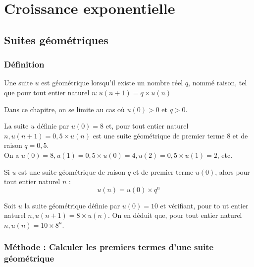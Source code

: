 \chapter{Croissance exponentielle}
\thispagestyle{fancy}

\section{Suites géométriques}

\subsection{Définition}

\begin{definition}
	Une suite $u$ est géométrique lorsqu'il existe un nombre réel $q$, nommé raison, tel que pour tout entier naturel $n: u(n+1)=q \times u(n)$
\end{definition}

\begin{remarque}
	Dans ce chapitre, on se limite au cas où $u(0)>0$ et $q>0$.
\end{remarque}

\begin{exemple}
	La suite $u$ définie par $u(0)=8$ et, pour tout entier naturel $n, u(n+1)=0,5 \times u(n)$ est une suite géométrique de premier terme 8 et de raison $q=0,5$.\\
	On a $u(0)=8, u(1)=0,5 \times u(0)=4, u(2)=0,5 \times u(1)=2$, etc.
\end{exemple}

\begin{propriete}
	Si $u$ est une suite géométrique de raison $q$ et de premier terme $u(0)$, alors pour tout entier naturel $n$ :
	$$
	u(n)=u(0) \times q^n
	$$
\end{propriete}

\begin{exemple}
	Soit $u$ la suite géométrique définie par $u(0)=10$ et vérifiant, pour to ut entier naturel $n, u(n+1)=8 \times u(n)$. On en déduit que, pour tout entier naturel $n, u(n)=10 \times 8^n$.
\end{exemple}

\subsection{Méthode : Calculer les premiers termes d'une suite géométrique}



